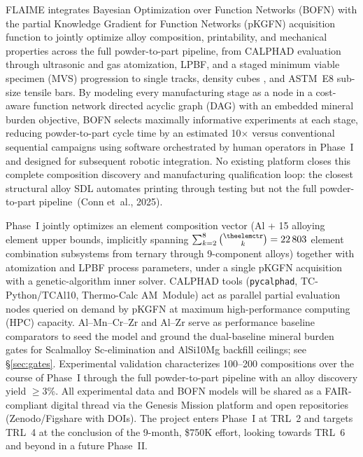 \documentclass[11pt,letterpaper]{article}
\newcommand{\kmin}{2}                    %
\newcommand{\kmax}{8}                    %
\newcounter{elemctr}
\newcommand{\elementcount}{\theelemctr}  %
\newcommand{\subsystemcount}{22\,803}    %
\begin{document}
FLAIME integrates Bayesian Optimization over Function Networks (BOFN) with
the partial Knowledge Gradient for Function Networks (pKGFN) acquisition
function to jointly optimize alloy composition, printability, and mechanical
properties across the full powder-to-part pipeline, from CALPHAD evaluation
through ultrasonic and gas atomization, LPBF,
and a staged minimum viable specimen (MVS) progression to single tracks,
density cubes
, and ASTM~E8 sub-size
tensile bars. By modeling every manufacturing stage as a node in
a cost-aware function network directed acyclic graph (DAG) with an embedded mineral burden objective,
BOFN selects maximally informative experiments at each stage, reducing
powder-to-part cycle time by an estimated 10$\times$ versus conventional
sequential campaigns
using software orchestrated by human operators in Phase~I and
designed for subsequent robotic integration.  No existing
platform closes this complete composition discovery and
manufacturing qualification loop: the closest structural alloy SDL
automates printing through testing but not the full
powder-to-part pipeline~(Conn et~al., 2025).

Phase~I jointly optimizes an element composition vector (Al + 15 alloying element
upper bounds, implicitly spanning $\sum\nolimits_{k=2}^{8}\tbinom{\elementcount}{k}=\subsystemcount{}$
element combination subsystems from ternary through 9-component alloys)
together with atomization and LPBF process parameters, under a single pKGFN
acquisition with a genetic-algorithm inner solver. CALPHAD tools
(\texttt{pycalphad}, TC-Python/TCAl10, Thermo-Calc AM~Module) act as
parallel
partial evaluation nodes queried on demand by
pKGFN at maximum high-performance computing (HPC) capacity.
Al--Mn--Cr--Zr and Al--Zr serve as performance
baseline comparators to seed the model and ground the dual-baseline
mineral burden gates for
Scalmalloy Sc-elimination and AlSi10Mg backfill
ceilings; see \S\ref{sec:gates}. Experimental validation characterizes 100--200 compositions over the course of Phase~I
through
the full powder-to-part pipeline with an alloy discovery yield $\geq$3\%.
All
experimental data and BOFN models will be shared as a FAIR-compliant
digital thread via the Genesis Mission platform and open repositories
(Zenodo/Figshare with DOIs). The project enters Phase~I at
TRL~2
and targets TRL~4
at the conclusion of the 9-month, \$750K effort, looking towards TRL~6 and beyond in a future Phase~II.
\end{document}
